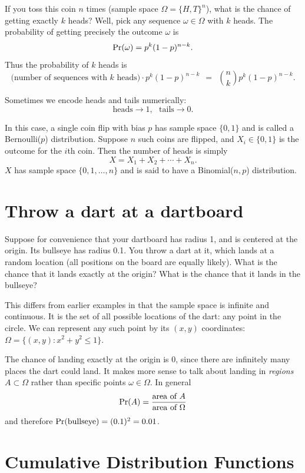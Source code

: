 If you toss this coin $n$ times (sample space $\Omega = \{H,T\}^n$), what is the chance of getting exactly $k$ heads? Well, pick any sequence $\omega \in \Omega$ with $k$ heads. The probability of getting precisely the outcome $\omega$ is
$$ \mbox{\rm Pr}(\omega) = p^k (1-p)^{n-k} .$$
Thus the probability of $k$ heads is
$$ \mbox{(number of sequences with $k$ heads)} \cdot p^k (1-p)^{n-k} 
\ \ = \ \ 
{n \choose k} p^k (1-p)^{n-k} .$$

Sometimes we encode heads and tails numerically:
$$ \mbox{heads} \rightarrow 1, \ \ \ \mbox{tails} \rightarrow 0 .$$

In this case, a single coin flip with bias $p$ has sample space $\{0,1\}$ and is called a Bernoulli($p$) distribution. Suppose $n$ such coins are flipped, and $X_i \in \{0,1\}$ is the outcome for the $i$th coin. Then the number of heads is simply 
$$ X = X_1 + X_2 + \cdots + X_n. $$
$X$ has sample space $\{0,1,\ldots,n\}$ and is said to have a Binomial($n,p$) distribution.


\section{Throw a dart at a dartboard} 

Suppose for convenience that your dartboard has radius 1, and is
centered at the origin. Its bullseye has radius 0.1. You throw a dart
at it, which lands at a random location (all positions on the board
are equally likely). What is the chance that it lands exactly at the
origin? What is the chance that it lands in the bullseye?

This differs from earlier examples in that the sample space is infinite and continuous. It is the set of all possible locations of the dart: any point in the circle. We can represent any such point by its $(x,y)$ coordinates: $\Omega = \{(x,y): x^2 + y^2 \leq 1\}$.

The chance of landing exactly at the origin is 0, since there are infinitely many places the dart could land. It makes more sense to talk about landing in {\it regions} $A \subset \Omega$ rather than specific points $\omega \in \Omega$. In general
$$ \mbox{\rm Pr}(A) = \frac{\mbox{area of $A$}}{\mbox{area of $\Omega$}} $$
and therefore $\mbox{\rm Pr}(\mbox{bullseye}) = (0.1)^2 = 0.01$.

\section{Cumulative Distribution Functions}

